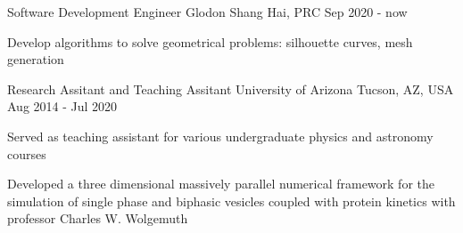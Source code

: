   
  \cventry
    {Software Development Engineer} %
    {Glodon} %
    {Shang Hai, PRC} %
    {Sep 2020 - now} %
    {
      \begin{cvitems} %
         \item {Develop algorithms to solve geometrical problems: silhouette curves, mesh generation}    
      \end{cvitems}
    }
    
  \cventry
    {Research Assitant and Teaching Assitant} %
    {University of Arizona} %
    {Tucson, AZ, USA} %
    {Aug 2014 - Jul 2020} %
    {
      \begin{cvitems} %
         \item {Served as teaching assistant for various undergraduate physics and astronomy courses}
         \item {Developed a three dimensional massively parallel numerical framework for the simulation of single phase and biphasic vesicles coupled with protein kinetics with professor Charles W. Wolgemuth}
      \end{cvitems}
    }
  

